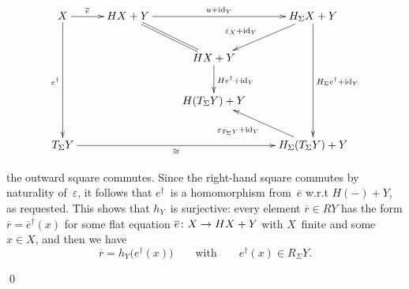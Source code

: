 \documentclass{entcs}
\DeclareMathOperator{\id}{id}
\begin{document}
\begin{pf}
\[
\xy
\xymatrix{
X
\ar[0,1]^-{\overline{e}}
\ar[3,0]_{e^\dag}
&
HX+Y
\ar[0,2]^-{u+\id_Y}
\ar @{=} [1,1]
&
&
H_\Sigma X+Y
\ar[3,0]^{H_\Sigma e^\dag+\id_Y}
\ar[1,-1]_{\varepsilon_X+\id_Y\phantom{MM}}
\\
&
&
HX+Y
\ar[1,0]^{He^\dag+\id_Y}
&
\\
&
&
H(T_\Sigma Y)+Y
&
\\
T_\Sigma Y
\ar[0,3]_-{\cong}
&
&
&
H_\Sigma(T_\Sigma Y)+Y
\ar[-1,-1]^{\varepsilon_{T_\Sigma Y}+\id_Y\phantom{MM}}
}
\endxy
\]
\vspace{1mm}

\noindent
the outward square commutes. Since the right-hand square commutes by
naturality of~$\varepsilon$, it follows that $e^\dag$~is a
homomorphism from~$\overline{e}$ w.r.t $H({-})+Y$, as
requested. This shows that $h_Y$~is surjective: every element
$\overline{r}\in RY$ has the form
$\overline{r}=\overline{e}^\dag(x)$ for some flat equation
$\overline{e}\colon X\to HX+\nolinebreak Y$ with $X$~finite and some
$x\in X$, and then we have
\[\overline{r}=h_Y\bigl(e^\dag(x)\bigr)\qquad\text{with}\qquad
e^\dag(x)\in R_\Sigma Y.\]
\mbox{}\vspace{-34pt}\par\mbox{}\qed
\end{pf}
\end{document}
